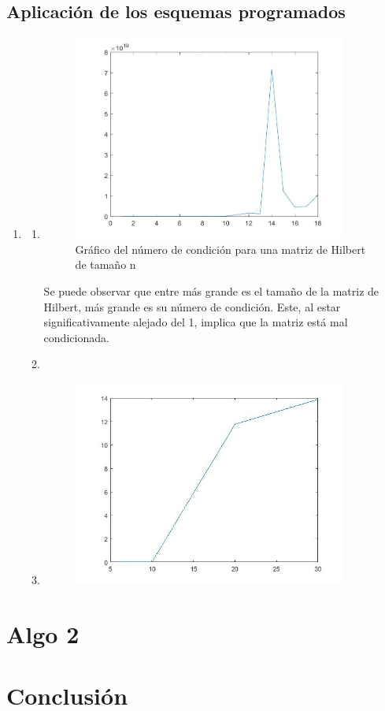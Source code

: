 \documentclass{udpreport}
\begin{document}
 \section{Aplicación de los esquemas programados}
 \begin{enumerate}
 	\item
 		\begin{enumerate}
 			\item 	
 			\begin{figure}[H]
 				\centering
 				\includegraphics[width=9cm]{grafo1-a}
 				\caption{Gráfico del número de condición para una matriz de Hilbert de tamaño n}
 			\end{figure}
 			Se puede observar que entre más grande es el tamaño de la matriz de Hilbert, más grande es su número de condición. Este, al estar significativamente alejado del 1, implica que la matriz está mal condicionada.  %
 			\item 
 			\item \begin{figure}[H]
 				\centering
 				\includegraphics[width=9cm]{grafo1-rfe}
 			\end{figure}
 		
 		
 		\end{enumerate}
	
 		
 \end{enumerate}
\newpage
\chapter{Algo 2}
    

     
 \newpage

    
    
\chapter{Conclusión}
      
\end{document}
